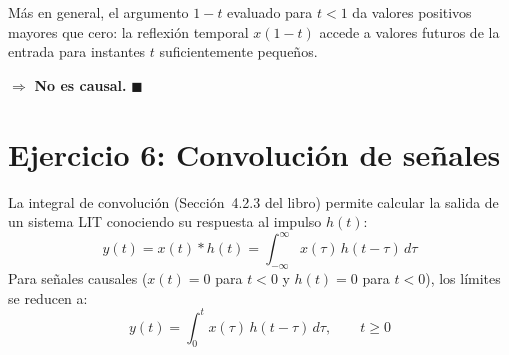\documentclass[10pt,a4paper]{article}
\begin{document}
	Más en general, el argumento $1-t$ evaluado para $t < 1$ da valores positivos mayores que cero: la reflexión temporal $x(1-t)$ accede a valores futuros de la entrada para instantes $t$ suficientemente pequeños.
	
	$\Rightarrow$ \textbf{No es causal.} $\blacksquare$

	\section*{Ejercicio 6: Convolución de señales}
	
	La integral de convolución (Sección~4.2.3 del libro) permite calcular la salida de un sistema LIT conociendo su respuesta al impulso $h(t)$:
	\[
	y(t) = x(t) * h(t) = \int_{-\infty}^{\infty} x(\tau)\,h(t-\tau)\,d\tau
	\]
	Para señales causales ($x(t) = 0$ para $t<0$ y $h(t) = 0$ para $t<0$), los límites se reducen a:
	\[
	y(t) = \int_{0}^{t} x(\tau)\,h(t-\tau)\,d\tau, \qquad t \geq 0
	\]
	
\end{document}

